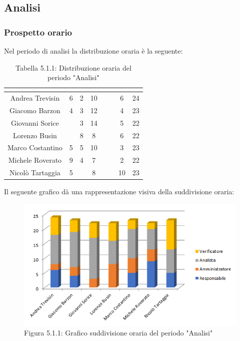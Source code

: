 \subsection{Analisi}

\subsubsection{Prospetto orario}
Nel periodo di analisi la distribuzione oraria è la seguente:

\renewcommand{\arraystretch}{1.4}
\begin{table}[H]
\begin{center}
\begin{tabular}{|c|c|c|c|c|c|c|c|}
\hline
\rowcolor{title_row}
\textbf{\color{title_text}{Nome}} & \textbf{\color{title_text}{Resp.}} & \textbf{\color{title_text}{Ammi.}} & \textbf{\color{title_text}{Analist.}} & \textbf{\color{title_text}{Progett.}} & \textbf{\color{title_text}{Program.}} & \textbf{\color{title_text}{Verific.}} & \textbf{\color{title_text}{Totale}} \\ \hline
Andrea Trevisin  & 6 & 2 & 10 & & & 6 & 24  \\ \hline
Giacomo Barzon   & 4 & 3 & 12 & & & 4 & 23  \\ \hline
Giovanni Sorice  & & 3 & 14 & & & 5 & 22  \\ \hline
Lorenzo Busin    & & 8 & 8 & & & 6 & 22  \\ \hline
Marco Costantino & 5 & 5 & 10 & & & 3 & 23 \\ \hline
Michele Roverato & 9 & 4 & 7 & & & 2 & 22 \\ \hline
Nicolò Tartaggia & 5 & & 8 & & & 10 & 23  \\ \hline
\end{tabular}
\caption{Tabella 5.1.1: Distribuzione oraria del periodo "Analisi"\label{}}
\end{center}
\end{table}
\renewcommand{\arraystretch}{1}

Il seguente grafico dà una rappresentazione visiva della suddivisione oraria: \\
\begin{figure} [H]
	\centering
	\includegraphics[scale=0.8]{Res/ExcelGrafici/Grafici/AnalisiOre.png}
	\caption{Figura 5.1.1: Grafico suddivisione oraria del periodo "Analisi"}\label{}
\end{figure}



